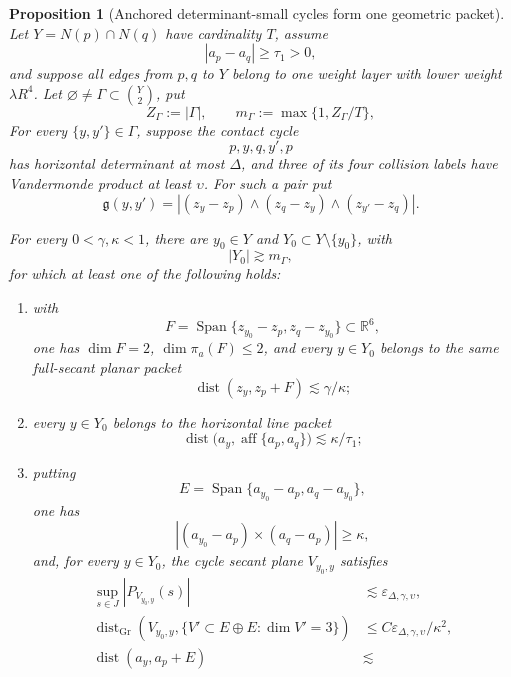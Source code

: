 \documentclass[10pt]{article}
\newtheorem{proposition}[theorem]{Proposition}
\newcommand{\R}{\mathbb R}
\newcommand{\Span}{\operatorname{Span}}
\begin{document}
\begin{proposition}[Anchored determinant-small cycles form one geometric packet]
\label{prop:v046-anchored-rank-packet}
Let \(Y=N(p)\cap N(q)\) have cardinality \(T\), assume
\[
|a_p-a_q|\ge\tau_1>0,
\]
and suppose all edges from \(p,q\) to \(Y\) belong to one weight layer with lower weight
\(\lambda R^4\).  Let \(\varnothing\ne\Gamma\subset\binom Y2\), put
\[
Z_\Gamma:=|\Gamma|,
\qquad
m_\Gamma:=\max\{1,Z_\Gamma/T\},
\]
For every \(\{y,y'\}\in\Gamma\), suppose the contact cycle
\[
p,y,q,y',p
\]
has horizontal determinant at most \(\Delta\), and three of its four collision labels have
Vandermonde product at least \(\upsilon\).
For such a pair put
\[
\mathfrak g(y,y')
=
\left|
(z_y-z_p)\wedge(z_q-z_y)\wedge(z_{y'}-z_q)
\right|.
\]

For every \(0<\gamma,\kappa<1\), there are \(y_0\in Y\) and
\(Y_0\subset Y\setminus\{y_0\}\), with
\[
|Y_0|\gtrsim m_\Gamma,
\]
for which at least one of the
following holds:
\begin{enumerate}[label=\textnormal{(\roman*)}]
\item with
\[
F
=
\Span\{z_{y_0}-z_p,z_q-z_{y_0}\}
\subset\R^6,
\]
one has \(\dim F=2\), \(\dim\pi_a(F)\le2\), and every \(y\in Y_0\) belongs to the same
full-secant planar packet
\begin{equation}
\label{eq:v046-anchored-full-rank-collapse}
\operatorname{dist}(z_y,z_p+F)
\lesssim
\gamma/\kappa;
\end{equation}
\item every \(y\in Y_0\) belongs to the horizontal line packet
\begin{equation}
\label{eq:v046-anchored-line-packet}
\operatorname{dist}
\bigl(a_y,\operatorname{aff}\{a_p,a_q\}\bigr)
\lesssim
\kappa/\tau_1;
\end{equation}
\item putting
\[
E
=
\Span\{a_{y_0}-a_p,a_q-a_{y_0}\},
\]
one has
\[
|(a_{y_0}-a_p)\times(a_q-a_p)|\ge\kappa,
\]
and, for every \(y\in Y_0\), the cycle secant plane \(V_{y_0,y}\) satisfies
\begin{equation}
\label{eq:v046-anchored-polarized-packet}
\boxed{
\begin{aligned}
\sup_{s\in J}|P_{V_{y_0,y}}(s)|
&\lesssim
\varepsilon_{\Delta,\gamma,\upsilon},\\
\operatorname{dist}_{\mathrm{Gr}}
\left(
V_{y_0,y},
\{V'\subset E\oplus E:\dim V'=3\}
\right)
&\le
C\varepsilon_{\Delta,\gamma,\upsilon}/\kappa^2,\\
\operatorname{dist}(a_y,a_p+E)
&\lesssim

\end{aligned}}
\end{equation}
\end{enumerate}
\end{proposition}
\end{document}
